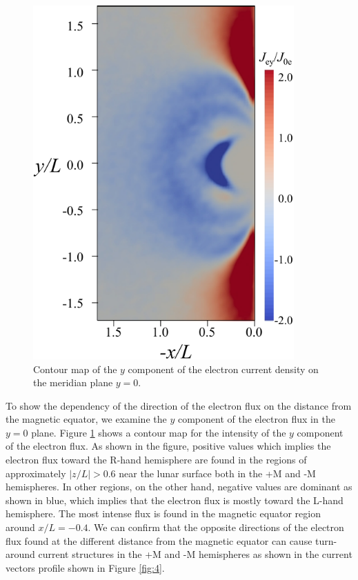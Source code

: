 \documentclass[draft,jgrga]{agutex2015}
\begin{document}
\begin{article}
\begin{figure}[h]
\centering
\noindent\includegraphics[width=10cm]{./figures/Fig_7_bb-crop.pdf}
\caption{Contour map of the $y$ component of the electron current density 
on the meridian plane $y=0$.}\label{fig:7} 
\end{figure}

To show the dependency of the direction of the electron flux on the distance
from the magnetic equator, 
we examine the $y$ component of the electron flux in the $y=0$ plane.
Figure \ref{fig:7} shows a contour map for the intensity of 
the $y$ component of the electron flux.
As shown in the figure, 
positive values which implies the electron flux toward the R-hand hemisphere
are found in the regions of approximately $|z/L| > 0.6$ near the lunar surface
both in the +M and -M hemispheres.
In other regions, on the other hand, 
negative values are dominant as shown in blue, 
which implies that the electron flux is mostly toward the L-hand hemisphere. 
The most intense flux is found in the magnetic equator region around $x/L=-0.4$.
We can confirm that the opposite directions of the electron flux found 
at the different distance from the magnetic equator can cause 
turn-around current structures in the +M and -M hemispheres
as shown in the current vectors profile shown in Figure \ref{fig:4}.



\end{article}
\end{document}
